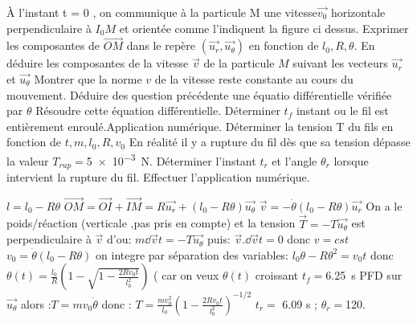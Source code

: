 \begin{Exercise}[title=(*)Enroulement d'un fil sur un cylindre]
	\Question À l’instant t = 0 , on communique à la particule M une vitesse$ \vec{v_0}$ horizontale perpendiculaire à  $I_0M$ et orientée comme l’indiquent la figure ci dessus.
	\Question Exprimer les composantes de $\vec{OM}$ dans le repère $(\vec{u_r} , \vec{u_\theta})$ en fonction de $l_0,R,\theta$.
	\Question En déduire les composantes de la vitesse $\vec{v}$ de la particule $M$ suivant les vecteurs $\vec{u_r}$ et $\vec{u_\theta}$
	\Question Montrer que la norme $v$ de la vitesse reste constante au cours du mouvement.
	\Question Déduire des question précédente une équatio différentielle vérifiée par $\theta$
	\Question Résoudre cette équation différentielle.
	\Question Déterminer $t_f$ instant ou le fil est entièrement enroulé.Application numérique.
	\Question
	\subQuestion Déterminer la tension T du fils en fonction de $t,m,l_0,R, v_0$
	\subQuestion En réalité il y a rupture du fil dès que sa tension dépasse la valeur $T_{rup} =$\SI{5e-3}{N}. Déterminer l'instant $t_r$ et l'angle $\theta_r$ lorsque intervient la rupture du fil. Effectuer l'application numérique.
\end{Exercise}
\begin{Answer}
	\Question $l = l_0 - R\theta$
	\Question $\vec{OM} = \vec{OI}+\vec{IM}=R\vec{u_r}+(l_0-R\theta)\vec{u_\theta}$
	\Question $\vec{v}=-\dot{\theta}(l_0-R\theta)\vec{u_r}$
	\Question On a le poids/réaction (verticale ,pas pris en compte) et la tension $\vec{T}=-T\vec{u_\theta}$ est perpendiculaire à $\vec{v}$ d'ou: $m\dd{\vec{v}}{t}=-T\vec{u_\theta}$ puis: $\vec{v}.\dd{\vec{v}}{t}=0$ donc $v=cst$
	\Question $v_0 = \dot{\theta}(l_0-R\theta)$
	\Question on integre par séparation des variables: $l_0\theta - R\theta^2=v_0t$ donc
	$\boxed{\theta(t)=\frac{l_0}{R}\left(1-\sqrt{1-\frac{2Rv_0t}{l_0^2}}\right)}$
	( car on veux $\theta(t)$ croissant
	\Question $t_f=$\SI{6.25}{s}
	\Question \subQuestion PFD sur $\vec{u_\theta}$ alors :$T=mv_0\dot{\theta}$ donc :
	$\boxed{T= \frac{mv_0^2}{l_0} \left(1-\frac{2Rv_0t}{l_0^2}\right)^{-1/2}}$
	\subQuestion $t_r=$ 6.09 s ; $\theta_r=$\SI{120}{\deg}.
\end{Answer}
